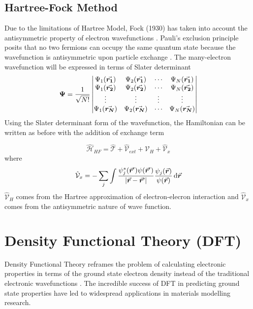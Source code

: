 \subsection{Hartree-Fock Method}
Due to the limitations of Hartree Model, Fock (1930) has taken into account the antisymmetric property of electron wavefunctions \citep{Fock1930}. Pauli's exclusion principle posits that no two fermions can occupy the same quantum state because the wavefunction is antisymmetric upon particle exchange \citep{Pauli1925}. The many-electron wavefunction will be expressed in terms of Slater determinant \citep{Slater1929}
\begin{equation}
	\mathbf{\Psi} = \frac{1}{\sqrt{N!}} \mdet{\Psi_1({\va*{r_1}}) & \Psi_2({\va*{r_1}}) & \cdots & \Psi_N({\va*{r_1}})  \\
		\Psi_1({\va*{r_2}}) & \Psi_2({\va*{r_2}}) & \cdots & \Psi_N({\va*{r_2}})\\
		\vdots & \vdots & \vdots & \vdots \\
		\Psi_1({\va*{r_N}}) & \Psi_2({\va*{r_N}}) & \cdots & \Psi_N({\va*{r_N}})
	}
\end{equation}
Using the Slater determinant form of the wavefunction, the Hamiltonian can be written as before with the addition of exchange term

\begin{equation} \label{eq:HF_H}
	\hat{\mathcal{H}}_{HF}  = \hat{\mathcal{T}}  + \hat{\mathcal{V}}_{ext} + \hat{\mathcal{V}}_H + \hat{\mathcal{V}}_x
\end{equation}
where
\begin{equation} \label{eq:HF-ex}
	\hat{\mathcal{V}}_x = - \sum_j \int \frac{\psi_j^*(\va*{r}') \psi(\va*{r}')}{\abs{{\va*{r} - \va*{r}'}} } \frac{\psi_j(\va*{r})}{\psi(\va*{r})} \dd{\va*{r}}
\end{equation}
$\hat{\mathcal{V}}_H$ comes from the Hartree approximation of electron-elecron interaction and $\hat{\mathcal{V}}_x$ comes from the antisymmetric
nature of wave function.

\section{Density Functional Theory (DFT)}
Density Functional Theory reframes the problem of calculating electronic properties in terms of the ground state electron density instead of the traditional electronic wavefunctions \citep{Kohn1999}. The incredible success of DFT in predicting ground state properties have led to widespread applications in materials modelling research.

